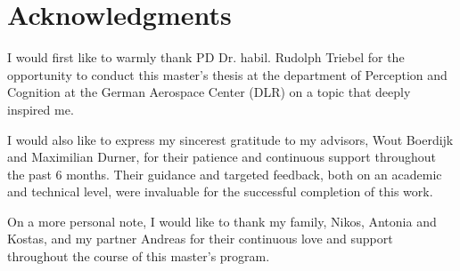 \chapter{Acknowledgments}

\makeatletter
{}
\makeatother

\vspace*{10mm}

    
    
\makeatletter

I would first like to warmly thank PD Dr. habil. Rudolph Triebel for the opportunity to conduct this master's thesis at the department of Perception and Cognition at the German Aerospace Center (DLR) on a topic that deeply inspired me.

I would also like to express my sincerest gratitude to
my advisors, Wout Boerdijk and Maximilian Durner, for their patience and continuous support throughout the past 6 months. Their guidance and targeted feedback, both on an academic and technical level, were invaluable for the successful completion of this work.

On a more personal note, I would like to thank my family, Nikos, Antonia and Kostas, and  my partner Andreas for their continuous love and support throughout the course of this master's program. 


\makeatother

\vspace{10mm}


\cleardoublepage{}
